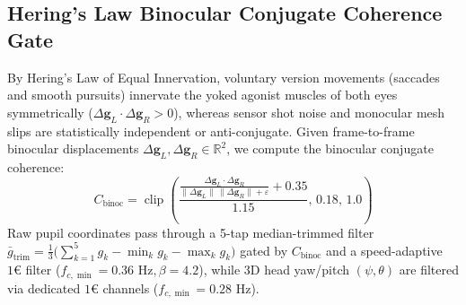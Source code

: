 \documentclass[twocolumn,10pt]{article}
\begin{document}
\subsection{Hering's Law Binocular Conjugate Coherence Gate}
By Hering's Law of Equal Innervation, voluntary version movements (saccades and smooth pursuits) innervate the yoked agonist muscles of both eyes symmetrically ($\Delta\mathbf{g}_L \cdot \Delta\mathbf{g}_R > 0$), whereas sensor shot noise and monocular mesh slips are statistically independent or anti-conjugate. Given frame-to-frame binocular displacements $\Delta\mathbf{g}_L, \Delta\mathbf{g}_R \in \mathbb{R}^2$, we compute the binocular conjugate coherence:
\begin{equation}
C_{\text{binoc}} = \operatorname{clip}\!\left(\frac{\frac{\Delta\mathbf{g}_L \cdot \Delta\mathbf{g}_R}{\|\Delta\mathbf{g}_L\|\,\|\Delta\mathbf{g}_R\| + \varepsilon} + 0.35}{1.15},\, 0.18,\, 1.0\right)
\end{equation}
Raw pupil coordinates pass through a 5-tap median-trimmed filter $\bar{g}_{\text{trim}} = \frac{1}{3}\big(\sum_{k=1}^5 g_k - \min_k g_k - \max_k g_k\big)$ gated by $C_{\text{binoc}}$ and a speed-adaptive $1\text{€}$ filter ($f_{c,\min} = 0.36\text{ Hz}, \beta = 4.2$), while 3D head yaw/pitch $(\psi, \theta)$ are filtered via dedicated $1\text{€}$ channels ($f_{c,\min} = 0.28\text{ Hz}$).
\end{document}
